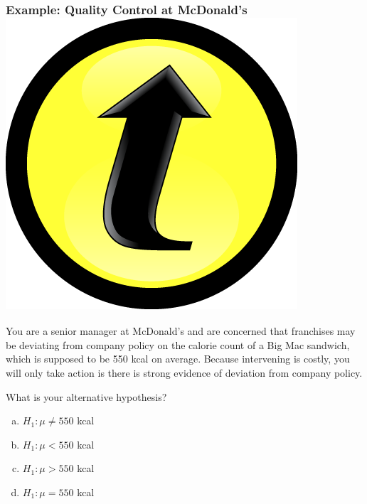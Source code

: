 \documentclass[handout]{beamer}
\begin{document}
\begin{frame}
\frametitle{Example: Quality Control at McDonald's \hfill \includegraphics[scale = 0.05]{./images/clicker}}

You are a senior manager at McDonald's and are concerned that franchises may be deviating from company policy on the calorie count of a Big Mac sandwich, which is supposed to be 550 kcal on average. Because intervening is costly, you will only take action is there is strong evidence of deviation from company policy. \\

\vspace{1em}

\alert{What is your alternative hypothesis?}
	\begin{enumerate}[(a)]
		\item $H_1\colon \mu \neq 550$ kcal
		\item $H_1\colon \mu < 550$ kcal
		\item $H_1\colon \mu > 550$ kcal
		\item $H_1\colon \mu = 550$ kcal
\end{enumerate}
\end{frame}
\end{document}
